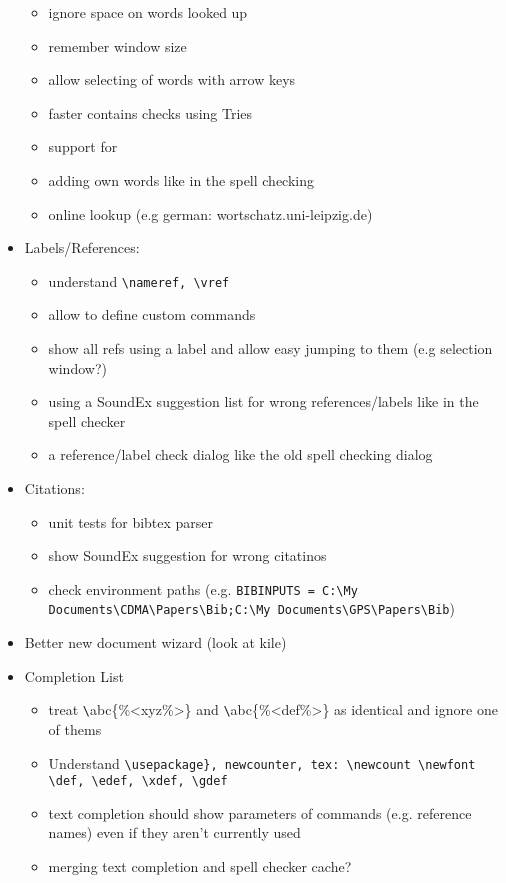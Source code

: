 \documentclass[10pt,a4paper,landscape]{report}
\begin{document}
\begin{itemize}
\begin{itemize}
		\item ignore space on words looked up
		\item remember window size
		\item allow selecting of words with arrow keys
		\item faster contains checks using Tries
		\item support for 
		\item adding own words like in the spell checking 
		\item online lookup (e.g german: wortschatz.uni-leipzig.de)
	\end{itemize}
	\item Labels/References: \begin{itemize}
		\item understand \verb+\nameref, \vref+
		\item allow to define custom commands
		\item 	show all refs using a label and allow easy jumping to them (e.g selection window?)
		\item using a SoundEx suggestion list for wrong references/labels like in the spell checker
		\item a reference/label check dialog like the old spell checking dialog
	\end{itemize}
	\item Citations: \begin{itemize}
		\item unit tests for bibtex parser
		\item show SoundEx suggestion for wrong citatinos
		\item check environment paths (e.g. \verb+BIBINPUTS = C:\My Documents\CDMA\Papers\Bib;C:\My Documents\GPS\Papers\Bib+)
	\end{itemize}
	\item Better new document wizard (look at kile)
	\item Completion List \begin{itemize}
		\item treat \verb+\+abc\{\%<xyz\%>\} and \verb+\+abc\{\%<def\%>\} as identical and ignore one of thems
		\item Understand \verb+\usepackage}, newcounter, tex: \newcount \newfont \def, \edef, \xdef, \gdef+
		\item text completion should show parameters of commands (e.g. reference names) even if they aren't currently used
		\item merging text completion and spell checker cache?
	\end{itemize}

\end{itemize}
\end{document}
